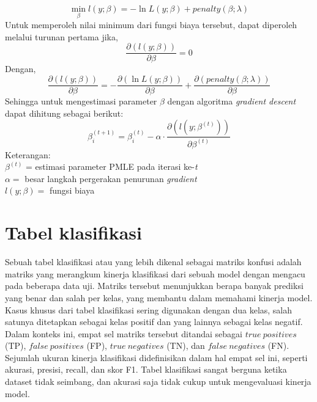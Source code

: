 \begin{equation}\label{objektifPenalty}
    \min_{\beta}{l(y;\beta)} = - \ln{L(y;\beta)} + penalty(\beta;\lambda)
\end{equation}
Untuk memperoleh nilai minimum dari fungsi biaya tersebut, dapat
diperoleh melalui turunan pertama jika,
\begin{equation}
    \frac{\partial\left( l(y;\beta) \right)}{\partial\beta} = 0
\end{equation}
Dengan,
\begin{equation}\label{turunanParsial2}
    \frac{\partial\left( l(y;\beta) \right)}{\partial\beta} = - \frac{\partial\left( \ln{L(y;\beta)} \right)}{\partial\beta} + \frac{\partial\left( penalty(\beta;\lambda) \right)}{\partial\beta}
\end{equation}
Sehingga untuk mengestimasi parameter \(\beta\) dengan algoritma
\emph{gradient descent} dapat dihitung sebagai berikut:
\begin{equation}
    \beta_{i}^{(t + 1)} = \beta_{i}^{(t)} - \alpha \cdot \frac{\partial\left( l\left( y;\beta^{(t)} \right) \right)}{\partial\beta^{(t)}}
\end{equation}
Keterangan:\\
\(\beta^{(t)}\) = estimasi parameter PMLE pada iterasi ke-\emph{t} \\
\(\alpha =\) besar langkah pergerakan penurunan \emph{gradient} \\
\(l(y;\beta) =\) fungsi biaya \\
%
\section{Tabel klasifikasi}
Sebuah tabel klasifikasi atau yang lebih dikenal sebagai matriks konfusi
adalah matriks yang merangkum kinerja klasifikasi dari sebuah model
dengan mengacu pada beberapa data uji. Matriks tersebut menunjukkan
berapa banyak prediksi yang benar dan salah per kelas, yang membantu
dalam memahami kinerja model. Kasus khusus dari tabel klasifikasi sering
digunakan dengan dua kelas, salah satunya ditetapkan sebagai kelas
positif dan yang lainnya sebagai kelas negatif. Dalam konteks ini, empat
sel matriks tersebut ditandai sebagai \(true\ positives\) (TP),
\(false\ positives\) (FP), \(true\ negatives\) (TN), dan
\(false\ negatives\) (FN). Sejumlah ukuran kinerja klasifikasi
didefinisikan dalam hal empat sel ini, seperti akurasi, presisi, recall,
dan skor F1. Tabel klasifikasi sangat berguna ketika dataset tidak
seimbang, dan akurasi saja tidak cukup untuk mengevaluasi kinerja model.

